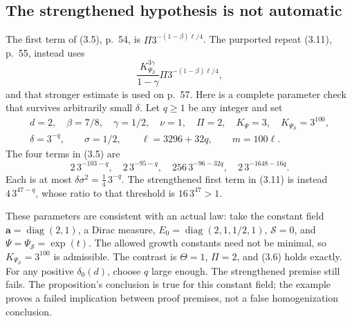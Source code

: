 \documentclass[10pt]{article}
\begin{document}
\subsection*{The strengthened hypothesis is not automatic}
The first term of (3.5), p. 54, is \(\Pi3^{-(1-\beta)\ell/4}\). The purported repeat (3.11), p. 55, instead uses \[\frac{K_{\Psi_{\mathcal S}}^{3\gamma}}{1-\gamma}
 \Pi3^{-(1-\beta)\ell/4},\] and that stronger estimate is used on p. 57. Here is a complete parameter check that survives arbitrarily small \(\delta\). Let \(q\ge1\) be any integer and set \[\begin{gathered}
 d=2,\quad\beta=7/8,\quad\gamma=1/2,\quad\nu=1,\quad
 \Pi=2,\quad K_\Psi=3,\quad K_{\Psi_{\mathcal S}}=3^{100},\\
 \delta=3^{-q},\qquad \sigma=1/2,\qquad
 \ell=3296+32q,\qquad m=100\ell.
 \end{gathered}\] The four terms in (3.5) are \[2\,3^{-103-q},\quad
 2\,3^{-95-q},\quad
 256\,3^{-96-32q},\quad
 2\,3^{-1648-16q}.\] Each is at most \(\delta\sigma^2=\tfrac14\,3^{-q}\). The strengthened first term in (3.11) is instead \(4\,3^{47-q}\), whose ratio to that threshold is \(16\,3^{47}>1\).\par
These parameters are consistent with an actual law: take the constant field \(\mathbf a=\operatorname{diag}(2,1)\), a Dirac measure, \(E_0=\operatorname{diag}(2,1,1/2,1)\), \(\mathcal S=0\), and \(\Psi=\Psi_{\mathcal S}=\exp(t)\). The allowed growth constants need not be minimal, so \(K_{\Psi_{\mathcal S}}=3^{100}\) is admissible. The contrast is \(\Theta=1\), \(\Pi=2\), and (3.6) holds exactly. For any positive \(\delta_0(d)\), choose \(q\) large enough. The strengthened premise still fails. The proposition’s conclusion is true for this constant field; the example proves a failed implication between proof premises, not a false homogenization conclusion.\par
\end{document}
